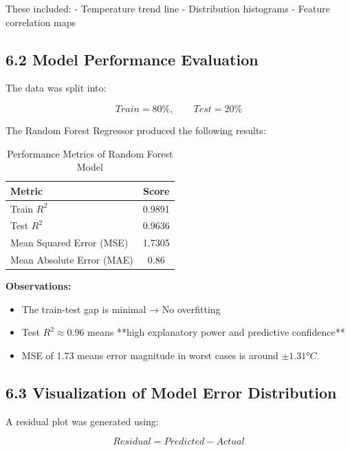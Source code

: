 \documentclass[12pt, a4paper]{article}
\begin{document}
These included:
- Temperature trend line
- Distribution histograms
- Feature correlation maps  


\subsection{\textbf{6.2 Model Performance Evaluation}}

The data was split into:

\[
Train = 80\%, \qquad Test = 20\%
\]

The Random Forest Regressor produced the following results:

\begin{table}[H]
\centering
\begin{tabular}{|l|c|}
\hline
\textbf{Metric} & \textbf{Score} \\
\hline
Train $R^2$ & 0.9891 \\
\hline
Test $R^2$ & 0.9636 \\
\hline
Mean Squared Error (MSE) & 1.7305 \\
\hline
Mean Absolute Error (MAE) & 0.86 \\
\hline
\end{tabular}
\caption{Performance Metrics of Random Forest Model}
\end{table}

\textbf{Observations:}

\begin{itemize}
    \item The train-test gap is minimal → No overfitting
    \item Test \( R^2 \approx 0.96 \) means **high explanatory power and predictive confidence**
    \item MSE of 1.73 means error magnitude in worst cases is around \( \pm 1.31°C \)
\end{itemize}


\subsection{\textbf{6.3 Visualization of Model Error Distribution}}

A residual plot was generated using:

\[
Residual = Predicted - Actual
\]
\end{document}
